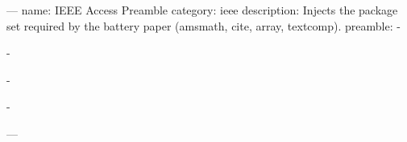 ---
name: IEEE Access Preamble
category: ieee
description: Injects the package set required by the battery paper (amsmath, cite, array, textcomp).
preamble:
  - \usepackage{amsmath,amssymb}
  - \usepackage{cite}
  - \usepackage{array}
  - \usepackage{textcomp}
---
\relax
